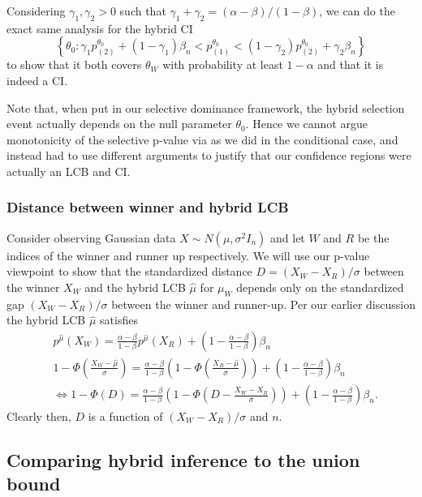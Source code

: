 \documentclass{article}
\begin{document}
\begin{appendix}
Considering $\gamma_1, \gamma_2 > 0$ such that $\gamma_1 + \gamma_2 = (\alpha-\beta)/(1-\beta)$, we can do the exact same analysis for the hybrid CI
\begin{equation*}
    \left\{\theta_0 : \gamma_1 p^{\theta_0}_{(2)} + (1-\gamma_1)\beta_n < p^{\theta_0}_{(1)} < (1- \gamma_2)p_{(2)}^{\theta_0} + \gamma_2 \beta_n\right\}
\end{equation*}
to show that it both covers $\theta_W$ with probability at least $1-\alpha$ and that it is indeed a CI. 

Note that, when put in our selective dominance framework, the hybrid selection event actually depends on the null parameter $\theta_0$. Hence we cannot argue monotonicity of the selective p-value via  as we did in the conditional case, and instead had to use different arguments to justify that our confidence regions were actually an LCB and CI. 

\subsubsection{Distance between winner and hybrid LCB}
\label{sec:hybrid_gap_appdx}

Consider observing Gaussian data $X \sim N(\mu, \sigma^2 I_n)$ and let $W$ and $R$ be the indices of the winner and runner up respectively. We will use our p-value viewpoint to show that the standardized distance $D = (X_W - X_R)/\sigma$ between the winner $X_W$ and the hybrid LCB $\hat{\mu}$ for $\mu_W$ depends only on the standardized gap $(X_W - X_R)/\sigma$ between the winner and runner-up. Per our earlier discussion the hybrid LCB $\hat{\mu}$ satisfies 
\begin{align*}
    & p^{\hat{\mu}}(X_W) = \frac{\alpha-\beta}{1-\beta} p^{\hat{\mu}}(X_R) + \left(1 - \frac{\alpha-\beta}{1-\beta} \right)\beta_n\\
    & 1 - \Phi\left(\frac{X_W - \hat{\mu}}{\sigma}\right) = \frac{\alpha-\beta}{1-\beta} \left(1 - \Phi\left(\frac{X_R - \hat{\mu}}{\sigma}\right)\right) + \left(1 - \frac{\alpha-\beta}{1-\beta} \right)\beta_n\\ 
    &\iff 1 - \Phi(D) = \frac{\alpha-\beta}{1-\beta} \left(1 - \Phi\left(D - \frac{X_W - X_R}{\sigma}\right) \right) + \left(1 - \frac{\alpha-\beta}{1-\beta} \right)\beta_n.
\end{align*}
Clearly then, $D$ is a function of $(X_W - X_R)/\sigma$ and $n$.

\subsection{Comparing hybrid inference to the union bound}
\label{sec:hybrid_sim_appdx}


\end{appendix}
\end{document}
